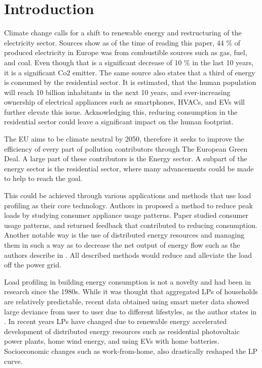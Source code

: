 \chapter{Introduction}
\label{chapter1}

Climate change calls for a shift to renewable energy and restructuring of the electricity sector.
Sources \cite{eurostat2020} show as of the time of reading this paper, 44 \% of produced electricity in Europe was from combustible sources such as gas, fuel, and coal. Even 
though that is a significant decrease of 10 \% in the last 10 years, it is a significant Co2 emitter.
The same source \cite{eurostat2020} also states that a third of energy is consumed by the residential sector. It is estimated, 
that the human population will reach 10 billion inhabitants in the next 10 years, and ever-increasing ownership of electrical appliances such as smartphones, HVACs, and EVs will further elevate this issue.
Acknowledging this, reducing consumption in the residential sector could leave a significant impact on the human footprint. 


The EU aims to be climate neutral by 2050, therefore it seeks to improve the efficiency of every part of pollution contributors through The European Green Deal.
A large part of these contributors is the Energy sector.
A subpart of the energy sector is the residential sector, where many advancements could be made to help to reach the goal.  

This could be achieved through various applications and methods that use load profiling as their core technology.
Authors in \cite{Chuan2014} proposed a method to reduce peak loads by studying consumer
appliance usage patterns. Paper \cite{Csoknyai2019} studied consumer usage patterns, and returned feedback that contributed to reducing consumption.
Another notable way is the use of distributed energy resources and managing them in such a way as to decrease the net output of energy flow such as the authors describe in
\cite{MORENOJARAMILLO2021445}. All described methods would reduce and alleviate the load off the power grid.

Load profiling in building energy consumption is not a novelty and had been in research since the 1980s.
While it was thought that aggregated LPs of households are relatively predictable, recent data obtained using smart meter data showed large deviance from user to user due to different lifestyles, as the author states in \cite{Review2021}.
In recent years LPs have changed due to renewable energy accelerated development of distributed energy resources such as residential photovoltaic
power plants, home wind energy, and using EVs with home batteries. Socioeconomic changes such as work-from-home, also drastically reshaped the LP curve. 

